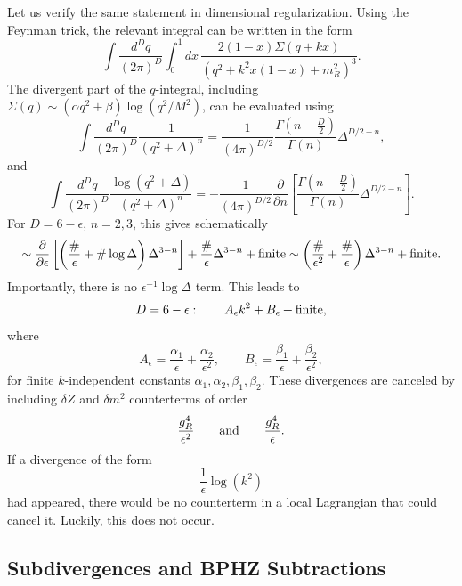 Let us verify the same statement in dimensional regularization.  Using the
Feynman trick, the relevant integral can be written in the form
\[
  \int\frac{d^Dq}{(2\pi)^D}\int_0^1 dx\,
  \frac{2(1-x)\Sigma(q+kx)}
       {(q^2+k^2x(1-x)+m_R^2)^3}.
\]
The divergent part of the \(q\)-integral, including
\(\Sigma(q)\sim(\alpha q^2+\beta)\log(q^2/M^2)\), can be evaluated using
\[
  \int\frac{d^Dq}{(2\pi)^D}
  \frac{1}{(q^2+\Delta)^n}
  =
  \frac{1}{(4\pi)^{D/2}}
  \frac{\Gamma(n-\frac{D}{2})}{\Gamma(n)}
  \Delta^{D/2-n},
\]
and
\[
  \int\frac{d^Dq}{(2\pi)^D}
  \frac{\log(q^2+\Delta)}{(q^2+\Delta)^n}
  =
  -\frac{1}{(4\pi)^{D/2}}
  \frac{\partial}{\partial n}
  \left[
    \frac{\Gamma(n-\frac{D}{2})}{\Gamma(n)}
    \Delta^{D/2-n}
  \right].
\]
For \(D=6-\epsilon\), \(n=2,3\), this gives schematically
\[
  \sim
  \frac{\partial}{\partial\epsilon}
  \left[
    \left(\frac{\#}{\epsilon}+\#\log\Delta\right)
    \Delta^{3-n}
  \right]
  +\frac{\#}{\epsilon}\Delta^{3-n}
  +\hbox{finite}
  \sim
  \left(\frac{\#}{\epsilon^2}+\frac{\#}{\epsilon}\right)
  \Delta^{3-n}
  +\hbox{finite}.
\]
Importantly, there is no \(\epsilon^{-1}\log\Delta\) term.  This leads to
\[
  D=6-\epsilon:\qquad
  A_\epsilon k^2+B_\epsilon+\hbox{finite},
\]
where
\[
  A_\epsilon=\frac{\alpha_1}{\epsilon}+\frac{\alpha_2}{\epsilon^2},
  \qquad
  B_\epsilon=\frac{\beta_1}{\epsilon}+\frac{\beta_2}{\epsilon^2},
\]
for finite \(k\)-independent constants
\(\alpha_1,\alpha_2,\beta_1,\beta_2\).  These divergences are canceled by
including \(\delta Z\) and \(\delta m^2\) counterterms of order
\[
  \frac{g_R^4}{\epsilon^2}
  \qquad\hbox{and}\qquad
  \frac{g_R^4}{\epsilon}.
\]
If a divergence of the form
\[
  \frac{1}{\epsilon}\log(k^2)
\]
had appeared, there would be no counterterm in a local Lagrangian that could
cancel it.  Luckily, this does not occur.

\subsection{Subdivergences and BPHZ Subtractions}

